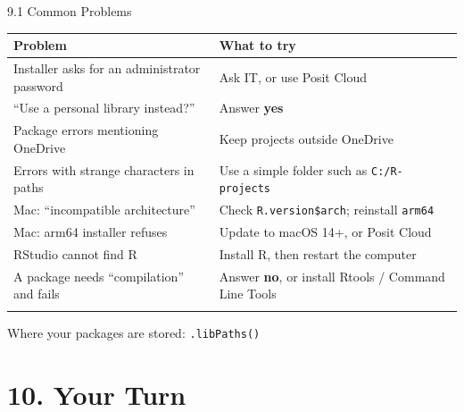 \documentclass[
  ignorenonframetext,
  aspectratio=169,
]{beamer}
\newcounter{none} %
\begin{document}
\begin{frame}[fragile]{9.1 Common Problems}
\protect{}\label{common-problems}
{\def\LTcaptype{none} %
\begin{longtable}[]{@{}
  >{\raggedright\arraybackslash}p{}
  >{\raggedright\arraybackslash}p{}@{}}
\toprule\noalign{}
\begin{minipage}[b]{\linewidth}\raggedright
Problem
\end{minipage} & \begin{minipage}[b]{\linewidth}\raggedright
What to try
\end{minipage} \\
\midrule\noalign{}
\endhead
Installer asks for an administrator password & Ask IT, or use Posit
Cloud \\
``Use a personal library instead?'' & Answer \textbf{yes} \\
Package errors mentioning OneDrive & Keep projects outside OneDrive \\
Errors with strange characters in paths & Use a simple folder such as
\texttt{C:/R-projects} \\
Mac: ``incompatible architecture'' & Check \texttt{R.version\$arch};
reinstall \texttt{arm64} \\
Mac: arm64 installer refuses & Update to macOS 14+, or Posit Cloud \\
RStudio cannot find R & Install R, then restart the computer \\
A package needs ``compilation'' and fails & Answer \textbf{no}, or
install Rtools / Command Line Tools \\
\bottomrule\noalign{}
\end{longtable}
}

Where your packages are stored: \texttt{.libPaths()}
\end{frame}

\section{10. Your Turn}\label{sec-your-turn}
\end{document}
